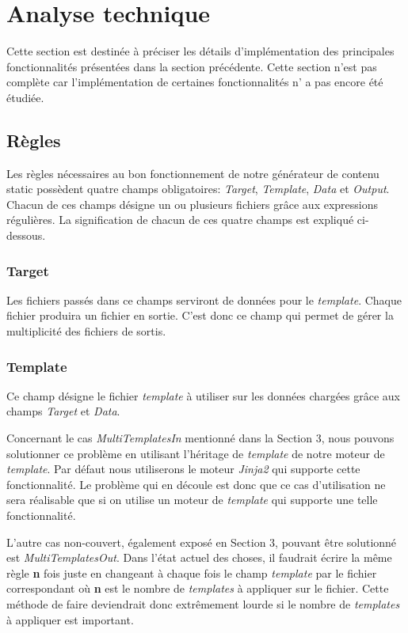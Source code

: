 \section{Analyse technique}
	Cette section est destinée à préciser les détails d'implémentation des principales fonctionnalités présentées dans la section précédente. Cette section n'est pas complète car l'implémentation de certaines fonctionnalités n' a pas encore été étudiée.
	
	\subsection{Règles}
		Les règles nécessaires au bon fonctionnement de notre générateur de contenu static possèdent quatre champs obligatoires: \textit{Target}, \textit{Template}, \textit{Data} et \textit{Output}. Chacun de ces champs désigne un ou plusieurs fichiers grâce aux expressions régulières. La signification de chacun de ces quatre champs est expliqué ci-dessous. 
		
		\subsubsection*{Target}
			Les fichiers passés dans ce champs serviront de données pour le \textit{template}. Chaque fichier produira un fichier en sortie. C'est donc ce champ qui permet de gérer la multiplicité des fichiers de sortis.
		
		\subsubsection*{Template}
			Ce champ désigne le fichier \textit{template} à utiliser sur les données chargées grâce aux champs \textit{Target} et \textit{Data}. 
			
			Concernant le cas \textit{MultiTemplatesIn} mentionné dans la Section 3, nous pouvons solutionner ce problème en utilisant l'héritage de \textit{template} de notre moteur de \textit{template}. Par défaut nous utiliserons le moteur \textit{Jinja2} \cite{Jinja2} qui supporte cette fonctionnalité. Le problème qui en découle est donc que ce cas d'utilisation ne sera réalisable que si on utilise un moteur de \textit{template} qui supporte une telle fonctionnalité.
			
			L'autre cas non-couvert, également exposé en Section 3, pouvant être solutionné est \textit{MultiTemplatesOut}. Dans l'état actuel des choses, il faudrait écrire la même règle \textbf{n} fois juste en changeant à chaque fois le champ \textit{template} par le fichier correspondant où \textbf{n} est le nombre de \textit{templates} à appliquer sur le fichier. Cette méthode de faire deviendrait donc extrêmement lourde si le nombre de \textit{templates} à appliquer est important.
		
